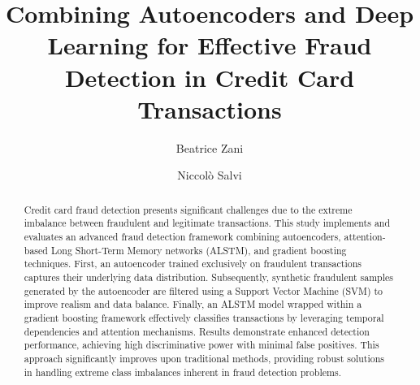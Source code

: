 \documentclass[sigconf]{acmart}
\begin{document}
\title[Combining Autoencoders and Deep Learning for Effective Fraud Detection in Credit Card Transactions]{Combining Autoencoders and Deep Learning for Effective Fraud Detection in Credit Card Transactions}


\author{Beatrice Zani}

\author{Niccolò Salvi}

\begin{abstract}
Credit card fraud detection presents significant challenges due to the extreme imbalance between fraudulent and legitimate transactions. This study implements and evaluates an advanced fraud detection framework combining autoencoders, attention-based Long Short-Term Memory networks (ALSTM), and gradient boosting techniques. First, an autoencoder trained exclusively on fraudulent transactions captures their underlying data distribution. Subsequently, synthetic fraudulent samples generated by the autoencoder are filtered using a Support Vector Machine (SVM) to improve realism and data balance. Finally, an ALSTM model wrapped within a gradient boosting framework effectively classifies transactions by leveraging temporal dependencies and attention mechanisms. Results demonstrate enhanced detection performance, achieving high discriminative power with minimal false positives. This approach significantly improves upon traditional methods, providing robust solutions in handling extreme class imbalances inherent in fraud detection problems.
\end{abstract}


\maketitle








\balance



\end{document}
